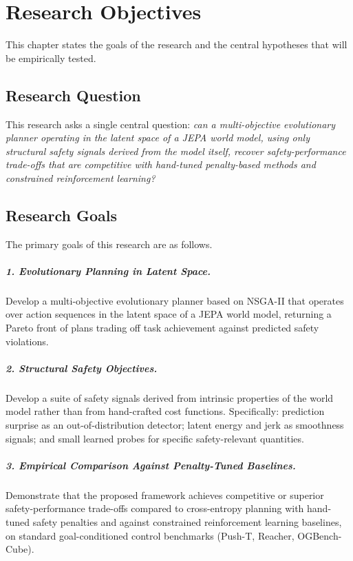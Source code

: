 \documentclass[a4paper,twoside,12pt]{report}
\begin{document}
\chapter{Research Objectives}\label{ch:objectives}

This chapter states the goals of the research and the central hypotheses that will be empirically tested.

\section{Research Question}

This research asks a single central question: \emph{can a multi-objective evolutionary planner operating in the latent space of a JEPA world model, using only structural safety signals derived from the model itself, recover safety-performance trade-offs that are competitive with hand-tuned penalty-based methods and constrained reinforcement learning?}

\section{Research Goals}

The primary goals of this research are as follows.

\paragraph{1. Evolutionary Planning in Latent Space.} Develop a multi-objective evolutionary planner based on NSGA-II that operates over action sequences in the latent space of a JEPA world model, returning a Pareto front of plans trading off task achievement against predicted safety violations.

\paragraph{2. Structural Safety Objectives.} Develop a suite of safety signals derived from intrinsic properties of the world model rather than from hand-crafted cost functions. Specifically: prediction surprise as an out-of-distribution detector; latent energy and jerk as smoothness signals; and small learned probes for specific safety-relevant quantities.

\paragraph{3. Empirical Comparison Against Penalty-Tuned Baselines.} Demonstrate that the proposed framework achieves competitive or superior safety-performance trade-offs compared to cross-entropy planning with hand-tuned safety penalties and against constrained reinforcement learning baselines, on standard goal-conditioned control benchmarks (Push-T, Reacher, OGBench-Cube).
\end{document}
